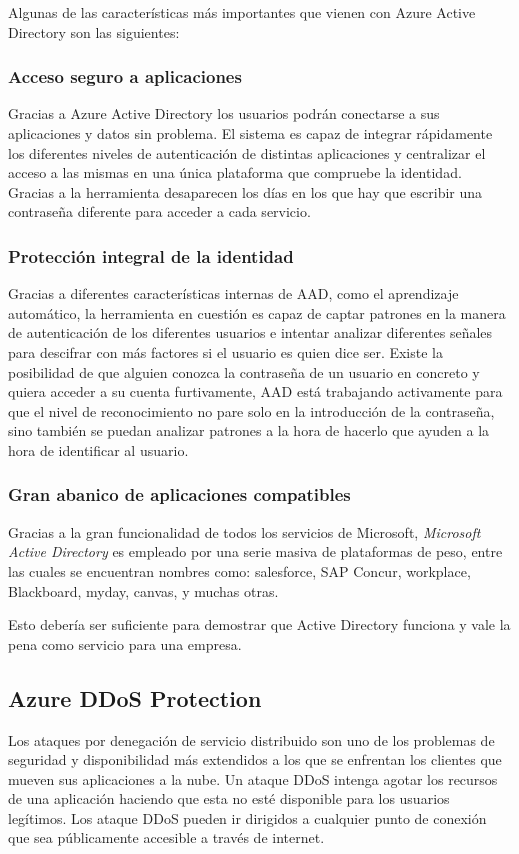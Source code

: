 \documentclass{article}
\begin{document}
Algunas de las características más importantes que vienen con Azure Active
Directory son las siguientes:

\subsubsection*{Acceso seguro a aplicaciones}
Gracias a Azure Active Directory los usuarios podrán conectarse a sus
aplicaciones y datos sin problema. El sistema es capaz de integrar rápidamente
los diferentes niveles de autenticación de distintas aplicaciones y centralizar
el acceso a las mismas en una única plataforma que compruebe la identidad.
Gracias a la herramienta desaparecen los días en los que hay que escribir una
contraseña diferente para acceder a cada servicio.

\subsubsection*{Protección integral de la identidad}
Gracias a diferentes características internas de AAD, como el aprendizaje
automático, la herramienta en cuestión es capaz de captar patrones en la manera
de autenticación de los diferentes usuarios e intentar analizar diferentes
señales para descifrar con más factores si el usuario es quien dice ser. Existe
la posibilidad de que alguien conozca la contraseña de un usuario en concreto y
quiera acceder a su cuenta furtivamente, AAD está trabajando activamente para
que el nivel de reconocimiento no pare solo en la introducción de la contraseña,
sino también se puedan analizar patrones a la hora de hacerlo que ayuden a la
hora de identificar al usuario.

\subsubsection*{Gran abanico de aplicaciones compatibles}
Gracias a la gran funcionalidad de todos los servicios de Microsoft,
\textit{Microsoft Active Directory} es empleado por una serie masiva de
plataformas de peso, entre las cuales se encuentran nombres como: salesforce,
SAP Concur, workplace, Blackboard, myday, canvas, y muchas otras. 

Esto debería ser suficiente para demostrar que Active Directory funciona y vale
la pena como servicio para una empresa. 

\subsection*{Azure DDoS Protection}
Los ataques por denegación de servicio distribuido son uno de los problemas de
seguridad y disponibilidad más extendidos a los que se enfrentan los clientes
que mueven sus aplicaciones a la nube. Un ataque DDoS intenga agotar los
recursos de una aplicación haciendo que esta no esté disponible para los
usuarios legítimos. Los ataque DDoS pueden ir dirigidos a cualquier punto de
conexión que sea públicamente accesible a través de internet.
\end{document}
